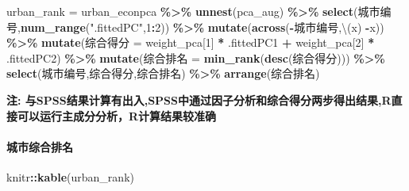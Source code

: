\documentclass[
]{article}
\newenvironment{Shaded}{\begin{snugshade}}{\end{snugshade}}
\newcommand{\DecValTok}[1]{\textcolor[rgb]{0.00,0.00,0.81}{#1}}
\newcommand{\FunctionTok}[1]{\textcolor[rgb]{0.13,0.29,0.53}{\textbf{#1}}}
\newcommand{\NormalTok}[1]{#1}
\newcommand{\OtherTok}[1]{\textcolor[rgb]{0.56,0.35,0.01}{#1}}
\newcommand{\SpecialCharTok}[1]{\textcolor[rgb]{0.81,0.36,0.00}{\textbf{#1}}}
\newcommand{\StringTok}[1]{\textcolor[rgb]{0.31,0.60,0.02}{#1}}
\begin{document}
\begin{Shaded}
\begin{Highlighting}[]
\NormalTok{urban\_rank }\OtherTok{=}\NormalTok{ urban\_econpca }\SpecialCharTok{\%\textgreater{}\%} 
  \FunctionTok{unnest}\NormalTok{(pca\_aug) }\SpecialCharTok{\%\textgreater{}\%} 
  \FunctionTok{select}\NormalTok{(城市编号,}\FunctionTok{num\_range}\NormalTok{(}\StringTok{".fittedPC"}\NormalTok{,}\DecValTok{1}\SpecialCharTok{:}\DecValTok{2}\NormalTok{)) }\SpecialCharTok{\%\textgreater{}\%} 
  \FunctionTok{mutate}\NormalTok{(}\FunctionTok{across}\NormalTok{(}\SpecialCharTok{{-}}\NormalTok{城市编号,\textbackslash{}(x) }\SpecialCharTok{{-}}\NormalTok{x)) }\SpecialCharTok{\%\textgreater{}\%} 
  \FunctionTok{mutate}\NormalTok{(综合得分 }\OtherTok{=}\NormalTok{ weight\_pca[}\DecValTok{1}\NormalTok{] }\SpecialCharTok{*}\NormalTok{ .fittedPC1 }\SpecialCharTok{+}\NormalTok{ weight\_pca[}\DecValTok{2}\NormalTok{] }\SpecialCharTok{*}\NormalTok{ .fittedPC2) }\SpecialCharTok{\%\textgreater{}\%} 
  \FunctionTok{mutate}\NormalTok{(综合排名 }\OtherTok{=} \FunctionTok{min\_rank}\NormalTok{(}\FunctionTok{desc}\NormalTok{(综合得分))) }\SpecialCharTok{\%\textgreater{}\%} 
  \FunctionTok{select}\NormalTok{(城市编号,综合得分,综合排名) }\SpecialCharTok{\%\textgreater{}\%} 
  \FunctionTok{arrange}\NormalTok{(综合排名)}
\end{Highlighting}
\end{Shaded}

\textbf{注:
与SPSS结果计算有出入,SPSS中通过因子分析和综合得分两步得出结果,R直接可以运行主成分分析，R计算结果较准确}

\paragraph{城市综合排名}\label{ux57ceux5e02ux7efcux5408ux6392ux540d}

\begin{Shaded}
\begin{Highlighting}[]
\NormalTok{knitr}\SpecialCharTok{::}\FunctionTok{kable}\NormalTok{(urban\_rank)}
\end{Highlighting}
\end{Shaded}
\end{document}
